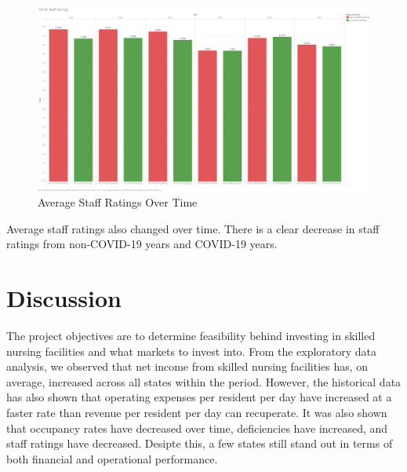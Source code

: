 \documentclass{article}
\theoremstyle{mytheoremstyle}
\theoremstyle{mytheoremstyle}
\theoremstyle{myproblemstyle}
\begin{document}
\begin{figure}[htbp]
\centering
\includegraphics[width=0.8\linewidth]{Images/COVID Staff Ratings.png}
\caption{Average Staff Ratings Over Time}
\label{ratings over time}
\end{figure}

\noindent Average staff ratings also changed over time. There is a clear decrease in staff ratings from non-COVID-19 years and COVID-19 years. 

\pagebreak



\pagebreak

\section{Discussion}

The project objectives are to determine feasibility behind investing in skilled nursing facilities and what markets to invest into. From the exploratory data analysis, we observed that net income from skilled nursing facilities has, on average, increased across all states within the period. However, the historical data has also shown that operating expenses per resident per day have increased at a faster rate than revenue per resident per day can recuperate. It was also shown that occupancy rates have decreased over time, deficiencies have increased, and staff ratings have decreased. Desipte this, a few states still stand out in terms of both financial and operational performance.
\end{document}
